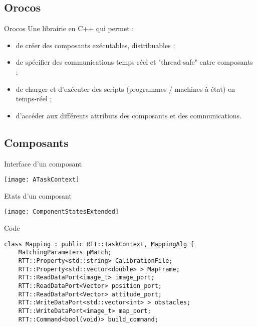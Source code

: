 \documentclass[compress]{beamer}
\begin{document}
\begin{frame}
\end{frame}

\subsection{Orocos}
\begin{frame}{Orocos}
Une librairie en C++ qui permet :
\begin{itemize}
\item de créer des composants exécutables, distribuables ;
\item de spécifier des communications temps-réel et "thread-safe" entre composants ;
\item de charger et d'exécuter des scripts (programmes / machines à état) en temps-réel ;
\item d'accéder aux différents attributs des composants et des communications.
\end{itemize}
\end{frame}

\subsection{Composants}
\begin{frame}{Interface d'un composant}
\begin{center}
\texttt{[image: ATaskContext]}
\end{center}
\end{frame}

\begin{frame}{Etats d'un composant}
\begin{center}
\texttt{[image: ComponentStatesExtended]}
\end{center}
\end{frame}

\begin{frame}[containsverbatim]{Code}
\lstset{language=C++,basicstyle=\tiny,tabsize=3}
\begin{lstlisting}[frame=trBL]
class Mapping : public RTT::TaskContext, MappingAlg {
	MatchingParameters pMatch;
	RTT::Property<std::string> CalibrationFile;
	RTT::Property<std::vector<double> > MapFrame;
	RTT::ReadDataPort<image_t> image_port;
	RTT::ReadDataPort<Vector> position_port;
	RTT::ReadDataPort<Vector> attitude_port;
	RTT::WriteDataPort<std::vector<int> > obstacles;
	RTT::WriteDataPort<image_t> map_port;
	RTT::Command<bool(void)> build_command;
\end{lstlisting}
\end{frame}
\end{document}
